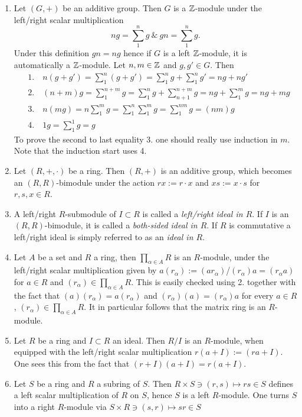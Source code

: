 \begin{example}
    \begin{enumerate}
        \item Let $(G,+)$ be an additive group. Then $G$ is a $\mathbb{Z}$-module under the left/right scalar multiplication
        $$ng = \sum_1^n g \ \& \ gn = \sum_1^n g.$$
        Under this definition $gn = ng$ hence if $G$ is a left $\mathbb{Z}$-module, it is automatically a $\mathbb{Z}$-module. Let $n,m\in \mathbb{Z}$ and $g,g'\in G$. Then 
        \begin{align*}
            &1. \quad  n(g+g') = \sum_1^n (g+g') = \sum_1^n g + \sum_1^n g' = ng+ng' \\
            &2. \quad (n+m)g = \sum_1^{n+m} g = \sum_1^n g + \sum_{n+1}^{n+m} g = ng + \sum_1^m g = ng +mg \\
            &3. \quad n(mg) = n\sum_1^m g = \sum_1^n\sum_1^m g =  \sum_1^{nm} g = (nm)g\\
            &4. \quad 1g = \sum_1^1 g = g
        \end{align*}
        To prove the second to last equality 3. one should really use induction in $m$. Note that the induction start uses 4.
        \item Let $(R,+,\cdot)$ be a ring. Then $(R,+)$ is an additive group, which becomes an $(R,R)$-bimodule under the action $rx := r\cdot x$ and $xs := x\cdot s$ for $r,s,x\in R$.
        \item A left/right $R$-submodule of $I\subset R$ is called a \textit{left/right ideal in $R$}. If $I$ is an $(R,R)$-bimodule, it is called a \textit{both-sided ideal in $R$}. If $R$ is commutative a left/right ideal is simply referred to as an \textit{ideal in $R$}. 
        \item Let $A$ be a set and $R$ a ring, then $\prod_{\alpha \in A} R$ is an $R$-module, under the left/right scalar multiplication given by $a(r_\alpha) := (ar_\alpha)$/$(r_\alpha)a=(r_\alpha a)$ for $a\in R$ and $(r_\alpha)\in \prod_{\alpha \in A} R$. This is easily checked using 2. together with the fact that $(a)(r_\alpha) = a(r_\alpha)$ and $(r_\alpha)(a) = (r_\alpha)a$ for every $a\in R$, $(r_\alpha)\in \prod_{\alpha \in A} R$. It in particular follows that the matrix ring is an $R$-module.
        \item Let $R$ be a ring and $I\subset R$ an ideal. Then $R/I$ is an $R$-module, when equipped with the left/right scalar multiplication $r(a+I) := (ra+I)$. One sees this from the fact that $(r+I)(a+I) = r(a+I)$. 
        \item Let $S$ be a ring and $R$ a subring of $S$. Then $ R\times S\ni(r,s) \mapsto rs\in S $ defines a left scalar multiplication of $R$ on $S$, hence $S$ is a left $R$-module. One turns $S$ into a right $R$-module via $S\times R \ni (s,r) \mapsto sr \in S$ 
    \end{enumerate}
\end{example}
